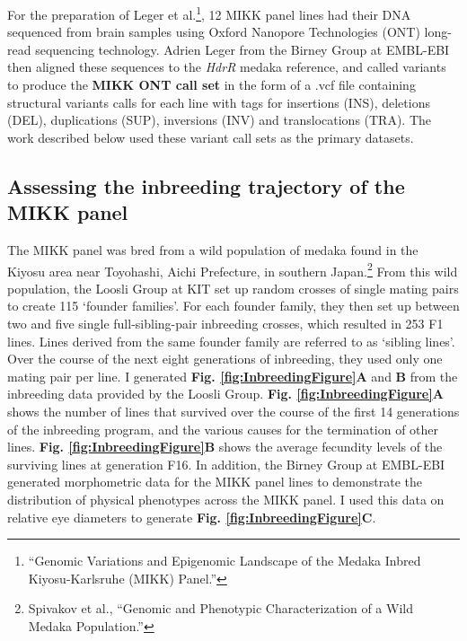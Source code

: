 \documentclass[
  9pt,
]{book}
\begin{document}
For the preparation of Leger et al.\footnote{{``Genomic Variations and Epigenomic Landscape of the {Medaka Inbred Kiyosu-Karlsruhe} ({MIKK}) Panel.''}}, 12 MIKK panel lines had their DNA sequenced from brain samples using Oxford Nanopore Technologies (ONT) long-read sequencing technology. Adrien Leger from the Birney Group at EMBL-EBI then aligned these sequences to the \emph{HdrR} medaka reference, and called variants to produce the \textbf{MIKK ONT call set} in the form of a .vcf file containing structural variants calls for each line with tags for insertions (INS), deletions (DEL), duplications (SUP), inversions (INV) and translocations (TRA). The work described below used these variant call sets as the primary datasets.

\hypertarget{inbreeding-sec}{%
\subsection{Assessing the inbreeding trajectory of the MIKK panel}\label{inbreeding-sec}}

The MIKK panel was bred from a wild population of medaka found in the Kiyosu area near Toyohashi, Aichi Prefecture, in southern Japan.\footnote{Spivakov et al., {``Genomic and {Phenotypic Characterization} of a {Wild Medaka Population}.''}} From this wild population, the Loosli Group at KIT set up random crosses of single mating pairs to create 115 `founder families'. For each founder family, they then set up between two and five single full-sibling-pair inbreeding crosses, which resulted in 253 F1 lines. Lines derived from the same founder family are referred to as `sibling lines'. Over the course of the next eight generations of inbreeding, they used only one mating pair per line. I generated \textbf{Fig. \ref{fig:InbreedingFigure}A} and \textbf{B} from the inbreeding data provided by the Loosli Group. \textbf{Fig. \ref{fig:InbreedingFigure}A} shows the number of lines that survived over the course of the first 14 generations of the inbreeding program, and the various causes for the termination of other lines. \textbf{Fig. \ref{fig:InbreedingFigure}B} shows the average fecundity levels of the surviving lines at generation F16. In addition, the Birney Group at EMBL-EBI generated morphometric data for the MIKK panel lines to demonstrate the distribution of physical phenotypes across the MIKK panel. I used this data on relative eye diameters to generate \textbf{Fig. \ref{fig:InbreedingFigure}C}.
\end{document}
